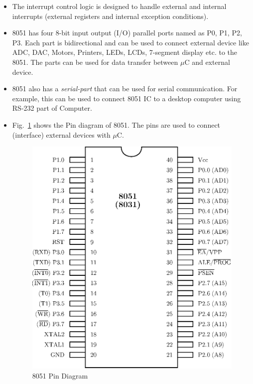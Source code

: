 \begin{itemize}
\begin{itemize}
\item The interrupt control logic is designed to handle external and internal interrupts (external registers and internal exception conditions).

\item 8051 has four 8-bit input output (I/O) parallel ports named as P0, P1, P2, P3. Each part is bidirectional and can be used to connect external device like ADC, DAC, Motors, Printers, LEDs, LCDs, 7-segment display etc. to the 8051. The parts can be used for data transfer between $\mu$C and external device.

\item 8051 also has a {\em serial-part} that can be used for serial communication. For example, this can be used to connect 8051 IC to a desktop computer using RS-232 part of Computer.
\end{itemize}
\end{itemize}

\begin{itemize}
\item Fig.~\ref{fig7.2} shows the Pin diagram of 8051. The pins are used to connect (interface) external devices with $\mu$C.
\begin{figure}[H]
\centering
\includegraphics[scale=.85]{chap7/fig7.2.eps}
\caption{8051 Pin Diagram}\label{fig7.2}
\end{figure}
\end{itemize}

